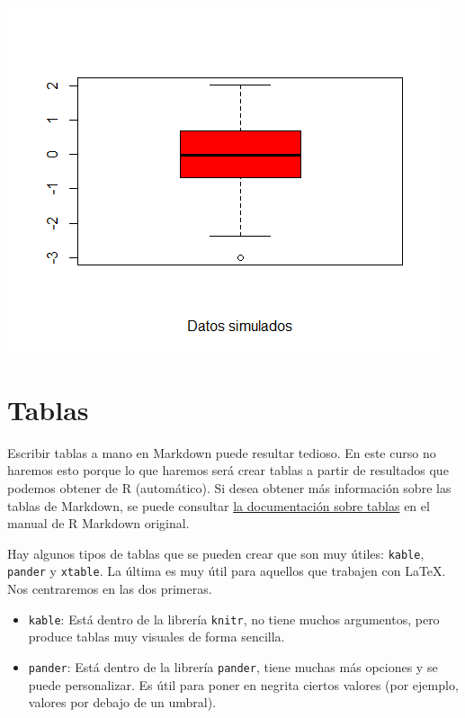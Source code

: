 \documentclass[
]{book}
\begin{document}
\begin{center}\includegraphics{fig/miplot-1} \end{center}

\hypertarget{tablas}{%
\section{Tablas}\label{tablas}}

Escribir tablas a mano en Markdown puede resultar tedioso. En este curso no haremos esto porque lo que haremos será crear tablas a partir de resultados que podemos obtener de R (automático). Si desea obtener más información sobre las tablas de Markdown, se puede consultar \href{https://rmarkdown.rstudio.com/authoring_pandoc_markdown.html\#tables}{la documentación sobre tablas} en el manual de R Markdown original.

Hay algunos tipos de tablas que se pueden crear que son muy útiles: \texttt{kable}, \texttt{pander} y \texttt{xtable}. La última es muy útil para aquellos que trabajen con LaTeX. Nos centraremos en las dos primeras.

\begin{itemize}
\item
  \texttt{kable}: Está dentro de la librería \texttt{knitr}, no tiene muchos argumentos, pero produce tablas muy visuales de forma sencilla.
\item
  \texttt{pander}: Está dentro de la librería \texttt{pander}, tiene muchas más opciones y se puede personalizar. Es útil para poner en negrita ciertos valores (por ejemplo, valores por debajo de un umbral).
\end{itemize}
\end{document}

